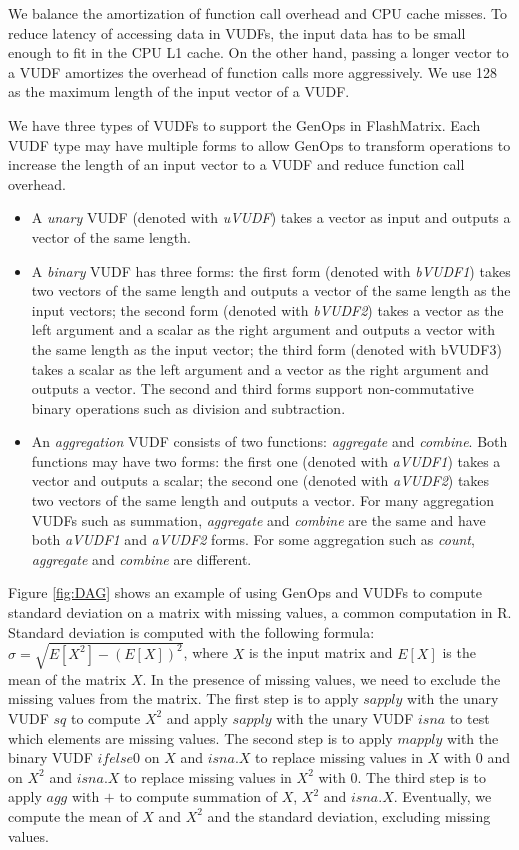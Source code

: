 We balance the amortization of function call overhead and CPU cache misses.
To reduce latency of accessing data in VUDFs,
the input data has to be small enough to fit in the CPU L1 cache. On the
other hand, passing a longer vector to a VUDF amortizes the overhead of
function calls more aggressively. We use 128 as the maximum length of
the input vector of a VUDF. %

We have three types of VUDFs to support the GenOps in FlashMatrix. Each VUDF
type may have multiple forms to allow GenOps to transform operations to
increase the length of an input vector to a VUDF and reduce function call
overhead.
\begin{itemize}
	\item A \textit{unary} VUDF (denoted with \textit{uVUDF}) takes a vector
		as input and outputs a vector of the same length.
	\item A \textit{binary} VUDF has three forms: the first form (denoted with
		\textit{bVUDF1}) takes two vectors of the same length and outputs
		a vector of the same length as the input vectors; the second form (denoted
		with \textit{bVUDF2}) takes a vector as the left argument and a scalar
		as the right argument and outputs a vector with the same length as
		the input vector; the third form (denoted with bVUDF3) takes a scalar
		as the left argument and a vector as the right argument and outputs
		a vector. The second and third forms support non-commutative binary
		operations such as division and subtraction.
	\item An \textit{aggregation} VUDF consists of two functions:
		\textit{aggregate} and \textit{combine}. Both functions may have two
		forms: the first one (denoted with \textit{aVUDF1}) takes a vector and
		outputs a scalar; the second one (denoted with \textit{aVUDF2}) takes
		two vectors of the same length and outputs a vector. For many
		aggregation VUDFs such as summation, \textit{aggregate} and
		\textit{combine} are the same and have both \textit{aVUDF1} and
		\textit{aVUDF2} forms. For some aggregation such as \textit{count},
		\textit{aggregate} and \textit{combine} are different.
\end{itemize}

Figure \ref{fig:DAG} shows an example of using GenOps and VUDFs to compute
standard deviation on a matrix with missing values, a common computation in R.
Standard deviation is computed with the following
formula: $\sigma = \sqrt{E[X^2] - (E[X])^2}$, where $X$ is the input matrix and
$E[X]$ is the mean of the matrix $X$. In the presence of missing values, we
need to exclude the missing values from the matrix. The first step is to apply
$sapply$ with the unary VUDF $sq$ to compute $X^2$ and apply $sapply$ with
the unary VUDF $isna$ to test which elements are missing values. The second
step is to apply $mapply$ with the binary VUDF $ifelse0$ on $X$ and $isna.X$
to replace missing
values in $X$ with 0 and on $X^2$ and $isna.X$ to replace missing values in
$X^2$ with 0. The third step is to apply $agg$ with $+$ to compute summation
of $X$, $X^2$ and $isna.X$. Eventually, we compute the mean of $X$ and
$X^2$ and the standard deviation, excluding missing values.

